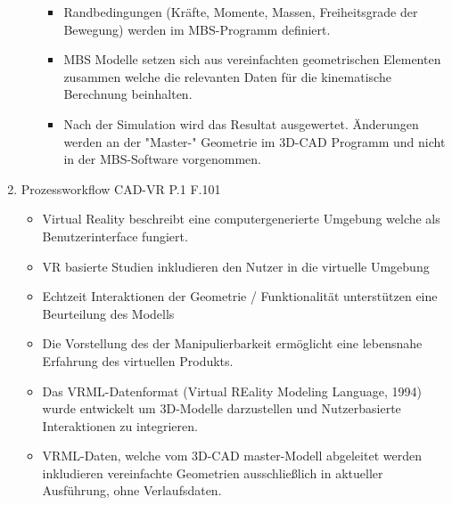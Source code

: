 \documentclass[10pt,a4paper,fleqn]{article}
\begin{document}
\begin{enumerate}
\begin{itemize}
\begin{itemize}
						\item Randbedingungen (Kräfte, Momente, Massen, Freiheitsgrade der Bewegung) werden im MBS-Programm definiert.
						\item MBS Modelle setzen sich aus vereinfachten geometrischen Elementen zusammen welche die relevanten Daten für die kinematische Berechnung beinhalten.
						\item Nach der Simulation wird das Resultat ausgewertet. Änderungen werden an der "Master-" Geometrie im 3D-CAD Programm und nicht in der MBS-Software vorgenommen.
					\end{itemize}
			\end{itemize}
	\item Prozessworkflow CAD-VR
		P.1 F.101
		\begin{itemize}
			\item Virtual Reality beschreibt eine computergenerierte Umgebung welche als Benutzerinterface fungiert.
			\item VR basierte Studien inkludieren den Nutzer in die virtuelle Umgebung
			\item Echtzeit Interaktionen der Geometrie / Funktionalität unterstützen eine Beurteilung des Modells
			\item Die Vorstellung des der Manipulierbarkeit ermöglicht eine lebensnahe Erfahrung des virtuellen Produkts.
			\item Das VRML-Datenformat (Virtual REality Modeling Language, 1994) wurde entwickelt um 3D-Modelle darzustellen und Nutzerbasierte Interaktionen zu integrieren.
			\item VRML-Daten, welche vom 3D-CAD master-Modell abgeleitet werden inkludieren vereinfachte Geometrien ausschließlich in aktueller Ausführung, ohne Verlaufsdaten.
		\end{itemize}

\end{enumerate}
\end{document}
